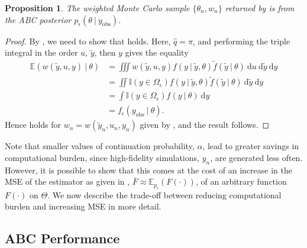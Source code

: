 \documentclass[12pt, onecolumn]{article}
\newcommand{\obs}[1]{#1_{\mathrm{obs}}}
\newtheorem{proposition}[theorem]{Proposition}
\begin{document}
\begin{proposition}
\label{MFABCValidity}
The weighted Monte Carlo sample $\{ \theta_n, w_n\}$ returned by  is from the ABC posterior $p_\epsilon(\theta~|~\obs y)$.
\end{proposition}
\begin{proof}
By , we need to show that  holds.
Here, $\hat q = \pi$, and performing the triple integral in the order $u$, $\tilde y$, then $y$ gives the equality
\begin{align*}
\mathbb E(w(\tilde y, u, y)~|~\theta) 
&= \iiint w(\tilde y, u, y) f(y~|~\tilde y, \theta) \tilde f(\tilde y~|~\theta) ~\mathrm du ~\mathrm d\tilde y ~\mathrm dy 
\\
&= \iint \mathbb I(y \in \Omega_\epsilon) f(y~|~\tilde y, \theta) \tilde f(\tilde y~|~\theta) ~\mathrm d\tilde y ~\mathrm dy
\\
&= \int \mathbb I(y \in \Omega_\epsilon) f(y~|~\theta) ~\mathrm dy
\\
&= f_\epsilon(\obs y~|~\theta).
\end{align*}
Hence  holds for $w_n = w(\tilde y_n, u_n, y_n)$ given by , and the result follows.
\end{proof}

Note that smaller values of continuation probability, $\alpha$, lead to greater savings in computational burden, since high-fidelity simulations, $y_n$, are generated less often.
However, it is possible to show that this comes at the cost of an increase in the MSE of the estimator as given in , $\bar F \approx \mathbb E_{p_\epsilon}(F(\cdot))$, of an arbitrary function $F(\cdot)$ on $\Theta$.
We now describe the trade-off between reducing computational burden and increasing MSE in more detail.

\subsection{ABC Performance}
\label{s:Performance}
\end{document}
